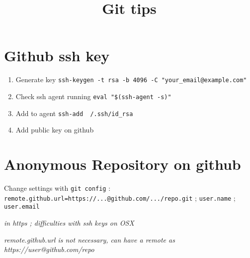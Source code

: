 


\title{Git tips}



\date{}


\maketitle

\justify

\renewcommand{\abstractname}{}

\begin{abstract}

\end{abstract}




\section*{Github ssh key}


\begin{enumerate}
\item Generate key \texttt{ssh-keygen -t rsa -b 4096 -C "your{\_}email@example.com"}
\item Check ssh agent running \texttt{eval "{\$}(ssh-agent -s)"}
\item Add to agent \texttt{ssh-add ~/.ssh/id{\_}rsa}
\item Add public key on github
\end{enumerate}




\section*{Anonymous Repository on github}

Change settings with \texttt{git config} : \texttt{remote.github.url=https://...@github.com/.../repo.git} ; \texttt{user.name} ; \texttt{user.email}

\textit{in https ; difficulties with ssh keys on OSX}

\textit{remote.github.url is not necessary, can have a remote as https://user@github.com/repo}
















